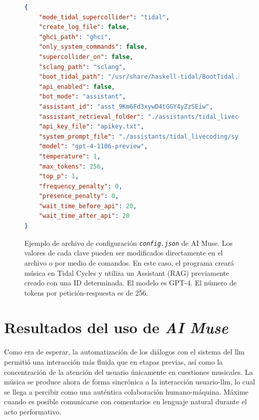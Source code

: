 \begin{figure}[H]
    \caption[Ejemplo de archivo de configuración \texttt{config.json} de AI Muse]{Ejemplo de archivo de configuración \texttt{\emph{config.json}} de AI Muse. Los valores de cada clave pueden ser modificados directamente en el archivo o por medio de comandos. En este caso, el programa creará música en Tidal Cycles y utiliza un Assistant (RAG) previamente creado con una ID determinada. El modelo es GPT-4. El número de tokens por petición-respuesta es de 256.}
    \centering
\begin{lstlisting}[language=json, numbers=none]
{
    "mode_tidal_supercollider": "tidal",
    "create_log_file": false,
    "ghci_path": "ghci",
    "only_system_commands": false,
    "supercollider_on": false,
    "sclang_path": "sclang",
    "boot_tidal_path": "/usr/share/haskell-tidal/BootTidal.hs",
    "api_enabled": false,
    "bot_mode": "assistant",
    "assistant_id": "asst_9Km6Fd3xywD4tGGY4yZzSEiw",
    "assistant_retrieval_folder": "./assistants/tidal_livecoding/retrieval_files/",
    "api_key_file": "apikey.txt",
    "system_prompt_file": "./assistants/tidal_livecoding/system_prompts/system_prompt_01",
    "model": "gpt-4-1106-preview",
    "temperature": 1,
    "max_tokens": 256,
    "top_p": 1,
    "frequency_penalty": 0,
    "presence_penalty": 0,
    "wait_time_before_api": 20,
    "wait_time_after_api": 20
}
\end{lstlisting}
    \source{\propio}
    \label{fig:json}
\end{figure}





\section{Resultados del uso de \emph{AI Muse}}

Como era de esperar, la automatización de los diálogos con el sistema del \gls{llm} permitió una interacción más fluida que en etapas previas, así como la concentración de la atención del usuario únicamente en cuestiones musicales. La música se produce ahora de forma sincrónica a la interacción usuario-\gls{llm}, lo cual se llega a percibir como una auténtica colaboración humano-máquina. Máxime cuando es posible comunicarse con comentarios en lenguaje natural durante el acto performativo.

